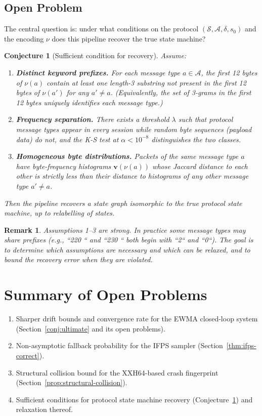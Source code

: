 \documentclass[11pt,a4paper]{article}
\newtheorem{conjecture}{Conjecture}
\newtheorem{remark}{Remark}
\begin{document}
\subsection{Open Problem}

The central question is: under what conditions on the protocol
$(\mathcal{S}, \mathcal{A}, \delta, s_0)$ and the encoding $\nu$ does
this pipeline recover the true state machine?

\begin{conjecture}[Sufficient condition for recovery]
\label{conj:ppsm}
Assume:
\begin{enumerate}
  \item \textbf{Distinct keyword prefixes.}
        For each message type $a \in \mathcal{A}$, the first 12 bytes
        of $\nu(a)$ contain at least one length-3 substring not present
        in the first 12 bytes of $\nu(a')$ for any $a' \neq a$.
        (Equivalently, the set of 3-grams in the first 12 bytes
        uniquely identifies each message type.)
  \item \textbf{Frequency separation.}
        There exists a threshold $\lambda$ such that protocol message
        types appear in every session while random byte sequences
        (payload data) do not, and the K-S test at $\alpha < 10^{-8}$
        distinguishes the two classes.
  \item \textbf{Homogeneous byte distributions.}
        Packets of the same message type $a$ have byte-frequency
        histograms $\mathbf{v}(\nu(a))$ whose Jaccard distance to each
        other is strictly less than their distance to histograms of
        any other message type $a' \neq a$.
\end{enumerate}
Then the pipeline recovers a state graph isomorphic to the true protocol
state machine, up to relabelling of states.
\end{conjecture}

\begin{remark}
Assumptions 1--3 are strong.  In practice some message types may share
prefixes (e.g., ``220 `` and ``230 `` both begin with ``2`` and ``0``).
The goal is to determine which assumptions are necessary and which can
be relaxed, and to bound the recovery error when they are violated.
\end{remark}

\section{Summary of Open Problems}

\begin{enumerate}
  \item Sharper drift bounds and convergence rate for the EWMA closed-loop
        system (Section~\ref{conj:ultimate} and its open problems).
  \item Non-asymptotic fallback probability for the IFPS sampler
        (Section~\ref{thm:ifps-correct}).
  \item Structural collision bound for the XXH64-based crash fingerprint
        (Section~\ref{prop:structural-collision}).
  \item Sufficient conditions for protocol state machine recovery
        (Conjecture~\ref{conj:ppsm}) and relaxation thereof.
\end{enumerate}
\end{document}
